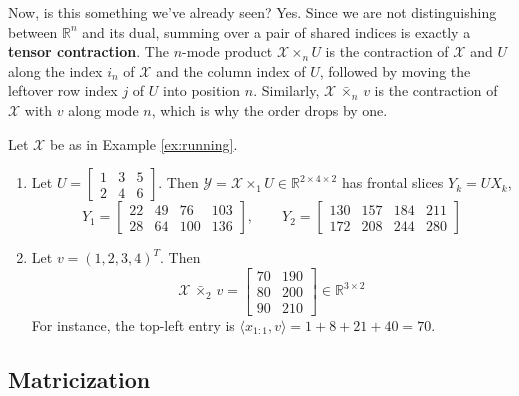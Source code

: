   Now, is this something we've already seen? Yes. Since we are not distinguishing between $\mathbb{R}^n$ and its dual, summing over a pair of shared indices is exactly a \textbf{tensor contraction}. The $n$-mode product $\mathcal{X} \times_n U$ is the contraction of $\mathcal{X}$ and $U$ along the index $i_n$ of $\mathcal{X}$ and the column index of $U$, followed by moving the leftover row index $j$ of $U$ into position $n$. Similarly, $\mathcal{X} \,\bar{\times}_n\, v$ is the contraction of $\mathcal{X}$ with $v$ along mode $n$, which is why the order drops by one.

  \begin{example}
    \label{ex:mode-products-of-the-running-tensor}
    Let $\mathcal{X}$ be as in Example \ref{ex:running}.
    \begin{enumerate}
      \item Let $U = \begin{bmatrix} 1 & 3 & 5 \\ 2 & 4 & 6 \end{bmatrix}$. Then $\mathcal{Y} = \mathcal{X} \times_1 U \in \mathbb{R}^{2 \times 4 \times 2}$ has frontal slices $Y_k = U X_k$,
      \begin{equation}
        Y_1 = \begin{bmatrix} 22 & 49 & 76 & 103 \\ 28 & 64 & 100 & 136 \end{bmatrix}, \qquad
        Y_2 = \begin{bmatrix} 130 & 157 & 184 & 211 \\ 172 & 208 & 244 & 280 \end{bmatrix}
      \end{equation}

      \item Let $v = (1, 2, 3, 4)^T$. Then
      \begin{equation}
        \mathcal{X} \,\bar{\times}_2\, v = \begin{bmatrix} 70 & 190 \\ 80 & 200 \\ 90 & 210 \end{bmatrix} \in \mathbb{R}^{3 \times 2}
      \end{equation}
      For instance, the top-left entry is $\langle x_{1:1}, v \rangle = 1 + 8 + 21 + 40 = 70$.
    \end{enumerate}
  \end{example}

\subsection{Matricization}


